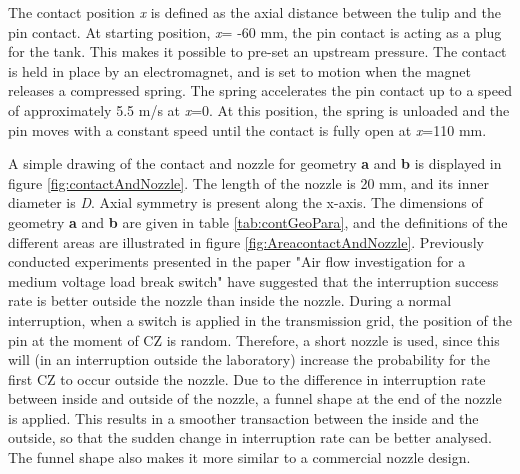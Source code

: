 \documentclass[10pt,b5paper,twoside]{article}
\begin{document}
The contact position \textit{x} is defined as the axial distance between the tulip and the pin contact. At starting position, \textit{x}= -60 mm, the pin contact is acting as a plug for the tank. This makes it possible to pre-set an upstream pressure. The contact is held in place by an electromagnet, and is set to motion when the magnet releases a compressed spring. The spring accelerates the pin contact up to a speed of approximately 5.5 m/s at \textit{x}=0. At this position, the spring is unloaded and the pin moves with a constant speed until the contact is fully open at \textit{x}=110 mm.

A simple drawing of the contact and nozzle for geometry \textbf{a} and \textbf{b} is displayed in figure \ref{fig:contactAndNozzle}. The length of the nozzle is 20 mm, and its inner diameter is \textit{D}. Axial symmetry is present along the x-axis. The dimensions of geometry \textbf{a} and \textbf{b} are given in table \ref{tab:contGeoPara}, and the definitions of the different areas are illustrated in figure \ref{fig:AreacontactAndNozzle}. Previously conducted experiments presented in the paper "Air flow investigation for a medium voltage load break switch" \cite{bib:AFIMVLBA} have suggested that the interruption success rate is better outside the nozzle than inside the nozzle. During a normal interruption, when a switch is applied in the transmission grid, the position of the pin at the moment of CZ is random. Therefore, a short nozzle is used, since this will (in an interruption outside the laboratory) increase the probability for the first CZ to occur outside the nozzle. Due to the difference in interruption rate between inside and outside of the nozzle, a funnel shape at the end of the nozzle is applied. This results in a smoother transaction between the inside and the outside, so that the sudden change in interruption rate can be better analysed. The funnel shape also makes it more similar to a commercial nozzle design.
\end{document}
